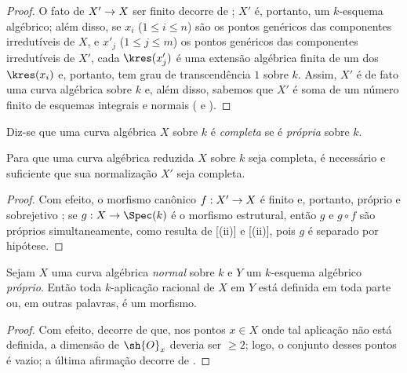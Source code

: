 \documentclass[oneside,10pt]{amsart}
\makeatletter
\renewcommand{\leq}{\leqslant}
\renewcommand{\geq}{\geqslant}
\newcommand{\ega@arrow}[2]{\mathchoice{#1}{#2}{#2}{#2}}
\renewcommand{\to}{\ega@arrow{\longrightarrow}{\rightarrow}}
\newcommand{\oldpage}[2][]{\marginnote{\normalfont\footnotesize\textbf{#1}~|~#2}\ignorespaces}
\let\EGAOriginalLabel\label
\renewcommand{\label}[1]{\phantomsection\EGAOriginalLabel{#1}}
\makeatother
\begin{document}
\begin{proof}
O fato de $X'\to X$ ser finito decorre de ;
$X'$ é, portanto, um $k$-esquema algébrico;
além disso, se $x_i$ ($1\leq i\leq n$) são os pontos genéricos das componentes irredutíveis de $X$, e $x'_j$ ($1\leq j\leq m$) os pontos genéricos das componentes irredutíveis de $X'$, cada $\kres(x'_j)$ é uma extensão algébrica finita de um dos $\kres(x_i)$  e, portanto, tem grau de transcendência $1$ sobre $k$.
Assim, $X'$ é de fato uma curva algébrica sobre $k$ e, além disso, sabemos que $X'$ é soma de um número finito de esquemas integrais e normais ( e ).
\end{proof}

\begin{env}[7.4.7]
\label{II.7.4.7}
Diz-se que uma curva algébrica $X$ sobre $k$ é \emph{completa} se é \emph{própria} sobre $k$.
\end{env}

\begin{corollary}[7.4.8]
\label{II.7.4.8}
Para que uma curva algébrica reduzida $X$ sobre $k$ seja completa, é necessário e suficiente que sua normalização $X'$ seja completa.
\end{corollary}

\oldpage[II]{150}
\begin{proof}
Com efeito, o morfismo canônico $f:X'\to X$ é finito  e, portanto, próprio  e sobrejetivo ;
se $g:X\to\Spec(k)$ é o morfismo estrutural, então $g$ e $g\circ f$ são próprios simultaneamente, como resulta de [(ii)] e [(ii)], pois $g$ é separado por hipótese.
\end{proof}

\begin{proposition}[7.4.9]
\label{II.7.4.9}
Sejam $X$ uma curva algébrica \emph{normal} sobre $k$ e $Y$ um $k$-esquema algébrico \emph{próprio}.
Então toda $k$-aplicação racional de $X$ em $Y$ está definida em toda parte ou, em outras palavras, é um morfismo.
\end{proposition}

\begin{proof}
Com efeito, decorre de  que, nos pontos $x\in X$ onde tal aplicação não está definida, a dimensão de $\sh{O}_x$ deveria ser $\geq2$; logo, o conjunto desses pontos é vazio;
a última afirmação decorre de .
\end{proof}
\end{document}

